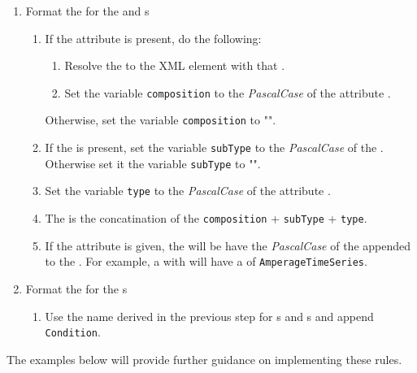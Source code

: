 \begin{enumerate}
\item Format the  for the  and  s
    \begin{enumerate}[after=\vspace{\baselineskip}]
    \setlength\itemsep{1em}
    \item If the  attribute  is present, do the following:
        \begin{enumerate}
        \item Resolve the  to the  XML element with that .
        \item Set the variable \texttt{composition} to the \textit{PascalCase} of the  attribute .
        \end{enumerate}
        Otherwise, set the variable \texttt{composition} to "".
    \item If the  is present, set the variable \texttt{subType} to the \textit{PascalCase} of the . Otherwise set it the variable \texttt{subType} to "".
    \item Set the variable \texttt{type} to the \textit{PascalCase} of the  attribute .
    \item The  is the concatination of the \texttt{composition} + \texttt{subType} + \texttt{type}.
    \item If the  attribute is given, the  will be have the \textit{PascalCase} of the  appended to the . For example, a  with  will have a  of \texttt{AmperageTimeSeries}.
    \end{enumerate}

\item Format the  for the  s
    \begin{enumerate}
    \item Use the name derived in the previous step for s and s and append \texttt{Condition}. 
    \end{enumerate}
\end{enumerate}

The examples below will provide further guidance on implementing these rules.

